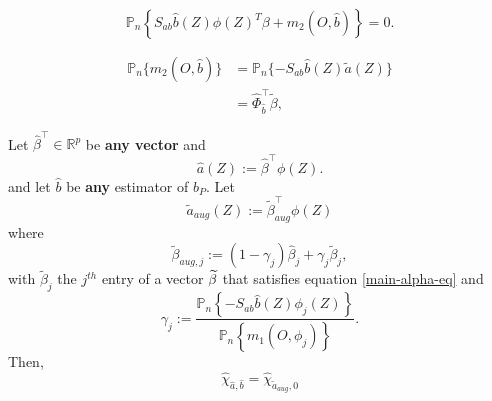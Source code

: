 \documentclass[10pt,a4paper]{amsart}
\begin{document}
\begin{equation}
\mathbb{P}_{n}\left\{ S_{ab}\widehat{b}(Z)\phi \left( Z\right) ^{T}\beta
+m_{2}(O,\widehat{b})\right\} =0.  \label{main-alpha-eq}
\end{equation}%

\begin{align}
\mathbb{P}_{n}\{m_{2}(O,\widehat{b})\}& =\mathbb{P}_{n}\{-S_{ab}\widehat{b}%
(Z)\widetilde{a}(Z)\}  \label{eq:basic} \\
& =\widehat{\Phi }_{\widehat{b}}^{\top }\widetilde{\beta },
\label{eq:linear_transform}
\end{align}%

\begin{proposition}\label{prop:main}
Let $\widehat{\beta }^{\top }\in \mathbb{R}^{p}$ be \textbf{any vector} and 
\begin{equation*}
\widehat{a}(Z):=\widehat{\beta }^{\top }\phi (Z).
\end{equation*}%
and let $\widehat{b}$ be \textbf{any} estimator of $b_{P}$. Let 
\begin{equation*}
\widetilde{a}_{aug}\left( Z\right) :=\widetilde{\beta }_{aug}^{\top }\phi (Z)
\end{equation*}%
where%
\begin{equation*}
\widetilde{\beta }_{aug,j}:=(1-\gamma _{j})\widehat{\beta }_{j}+\gamma _{j}%
\widetilde{\beta }_{j},
\end{equation*}%
with $\widetilde{\beta }_{j}$ the $j^{th}$ entry of a vector $\widetilde{%
\beta }$ that satisfies equation \eqref{main-alpha-eq} and 
\begin{equation*}
\gamma _{j}:=\frac{\mathbb{P}_{n}\left\{ -S_{ab}\widehat{b}(Z)\phi
_{j}(Z)\right\} }{\mathbb{P}_{n}\left\{ m_{1}(O,\phi _{j})\right\} }.
\end{equation*}%
Then, 
\begin{equation}
\widehat{\chi }_{\widehat{a},\widehat{b}}=\widehat{\chi }_{\widetilde{a}%
_{aug},0}  \label{eq:main_aug}
\end{equation}
\end{proposition}
\end{document}
